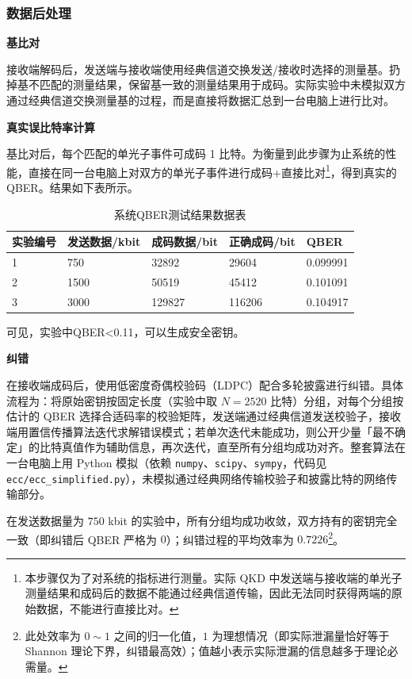 \documentclass[UTF8]{ctexart}
\begin{document}
\subsubsection{数据后处理}

\textbf{基比对}

接收端解码后，发送端与接收端使用经典信道交换发送/接收时选择的测量基。扔掉基不匹配的测量结果，保留基一致的测量结果用于成码。实际实验中未模拟双方通过经典信道交换测量基的过程，而是直接将数据汇总到一台电脑上进行比对。

\textbf{真实误比特率计算}

基比对后，每个匹配的单光子事件可成码 1  比特。为衡量到此步骤为止系统的性能，直接在同一台电脑上对双方的单光子事件进行成码+直接比对\footnote{本步骤仅为了对系统的指标进行测量。实际 QKD 中发送端与接收端的单光子测量结果和成码后的数据不能通过经典信道传输，因此无法同时获得两端的原始数据，不能进行直接比对。}，得到真实的 QBER。结果如下表所示。

\begin{table}[!ht]
    \centering
    \caption{系统QBER测试结果数据表}
    \begin{tabular}{|l|l|l|l|l|}
    \hline
        实验编号 & 发送数据/kbit & 成码数据/bit & 正确成码/bit & QBER \\ \hline
        1 & 750 & 32892 & 29604 & 0.099991 \\ \hline
        2 & 1500 & 50519 & 45412 & 0.101091 \\ \hline
        3 & 3000 & 129827 & 116206 & 0.104917 \\ \hline
    \end{tabular}
\end{table}

可见，实验中QBER<0.11，可以生成安全密钥。

\textbf{纠错}

在接收端成码后，使用低密度奇偶校验码（LDPC）配合多轮披露进行纠错。具体流程为：将原始密钥按固定长度（实验中取 $N=2520$ 比特）分组，对每个分组按估计的 QBER 选择合适码率的校验矩阵，发送端通过经典信道发送校验子，接收端用置信传播算法迭代求解错误模式；若单次迭代未能成功，则公开少量「最不确定」的比特真值作为辅助信息，再次迭代，直至所有分组均成功对齐。整套算法在一台电脑上用 Python 模拟（依赖 \texttt{numpy}、\texttt{scipy}、\texttt{sympy}，代码见 \texttt{ecc/ecc\_simplified.py}），未模拟通过经典网络传输校验子和披露比特的网络传输部分。

在发送数据量为 $750$ kbit 的实验中，所有分组均成功收敛，双方持有的密钥完全一致（即纠错后 QBER 严格为 $0$）；纠错过程的平均效率为 $0.7226$\footnote{此处效率为 $0\sim1$ 之间的归一化值，$1$ 为理想情况（即实际泄漏量恰好等于 Shannon 理论下界，纠错最高效）；值越小表示实际泄漏的信息越多于理论必需量。}。
\end{document}
